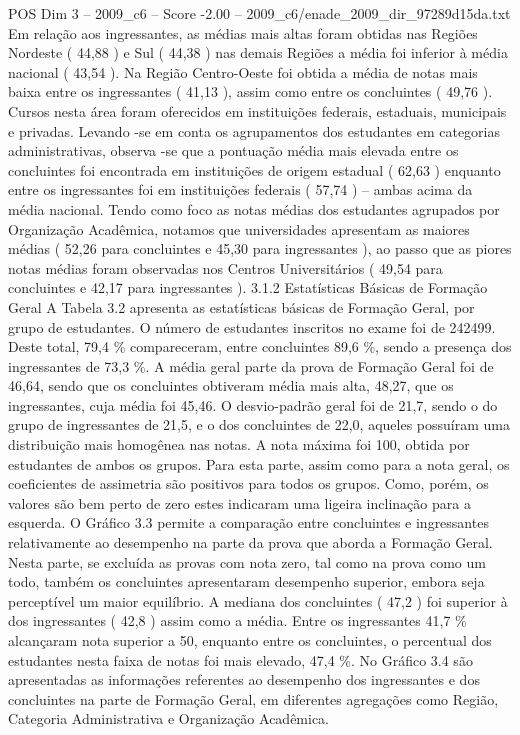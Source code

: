 \begin{textsample}{POS Dim 3 – 2009\_c6 – Score -2.00 – 2009\_c6/enade\_2009\_dir\_97289d15da.txt}
Em relação aos ingressantes, as médias mais altas foram obtidas nas Regiões Nordeste ( 44,88 ) e Sul ( 44,38 ) nas demais Regiões a média foi inferior à média nacional ( 43,54 ).
Na Região Centro-Oeste foi obtida a média de notas mais baixa entre os ingressantes ( 41,13 ), assim como entre os concluintes ( 49,76 ).
Cursos nesta área foram oferecidos em instituições federais, estaduais, municipais e privadas.
Levando -se em conta os agrupamentos dos estudantes em categorias administrativas, observa -se que a pontuação média mais elevada entre os concluintes foi encontrada em instituições de origem estadual ( 62,63 ) enquanto entre os ingressantes foi em instituições federais ( 57,74 ) – ambas acima da média nacional.
Tendo como foco as notas médias dos estudantes agrupados por Organização Acadêmica, notamos que universidades apresentam as maiores médias ( 52,26 para concluintes e 45,30 para ingressantes ), ao passo que as piores notas médias foram observadas nos Centros Universitários ( 49,54 para concluintes e 42,17 para ingressantes ). 3.1.2 Estatísticas Básicas de Formação Geral A Tabela 3.2 apresenta as estatísticas básicas de Formação Geral, por grupo de estudantes.
O número de estudantes inscritos no exame foi de 242499.
Deste total, 79,4 \% compareceram, entre concluintes 89,6 \%, sendo a presença dos ingressantes de 73,3 \%.
A média geral parte da prova de Formação Geral foi de 46,64, sendo que os concluintes obtiveram média mais alta, 48,27, que os ingressantes, cuja média foi 45,46.
O desvio-padrão geral foi de 21,7, sendo o do grupo de ingressantes de 21,5, e o dos concluintes de 22,0, aqueles possuíram uma distribuição mais homogênea nas notas.
A nota máxima foi 100, obtida por estudantes de ambos os grupos.
Para esta parte, assim como para a nota geral, os coeficientes de assimetria são positivos para todos os grupos.
Como, porém, os valores são bem perto de zero estes indicaram uma ligeira inclinação para a esquerda.
O Gráfico 3.3 permite a comparação entre concluintes e ingressantes relativamente ao desempenho na parte da prova que aborda a Formação Geral.
Nesta parte, se excluída as provas com nota zero, tal como na prova como um todo, também os concluintes apresentaram desempenho superior, embora seja perceptível um maior equilíbrio.
A mediana dos concluintes ( 47,2 ) foi superior à dos ingressantes ( 42,8 ) assim como a média.
Entre os ingressantes 41,7 \% alcançaram nota superior a 50, enquanto entre os concluintes, o percentual dos estudantes nesta faixa de notas foi mais elevado, 47,4 \%.
No Gráfico 3.4 são apresentadas as informações referentes ao desempenho dos ingressantes e dos concluintes na parte de Formação Geral, em diferentes agregações como Região, Categoria Administrativa e Organização Acadêmica.

\end{textsample}
